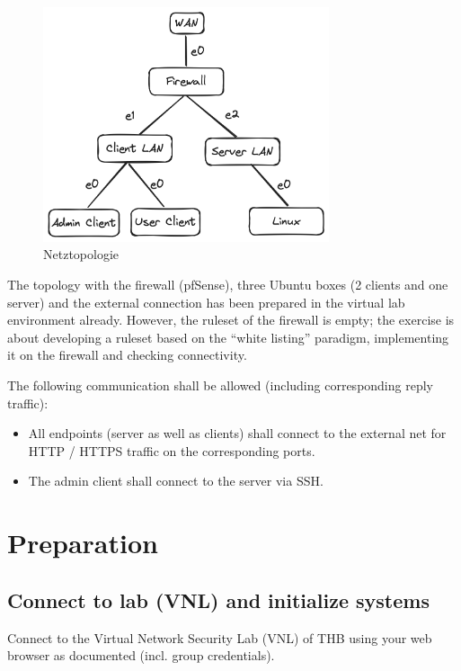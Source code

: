 \documentclass{article}
\begin{document}
\begin{figure}[H]
	\includegraphics[width=0.75\textwidth]{images/01}
	\centering
	\caption{Netztopologie}
\end{figure}

The topology with the firewall (pfSense), three Ubuntu boxes (2 clients and one 
server) and the external connection has been prepared in the virtual lab environment 
already. However, the ruleset of the firewall is empty; the exercise is about 
developing a ruleset based on the “white listing” paradigm, implementing it on the 
firewall and checking connectivity.

The following communication shall be allowed (including corresponding reply traffic):

\begin{itemize}
    \item All endpoints (server as well as clients) shall connect to the external net for HTTP / HTTPS traffic on the corresponding ports.
    \item The admin client shall connect to the server via SSH.
\end{itemize}

\section{Preparation}

\subsection{Connect to lab (VNL) and initialize systems}

Connect to the Virtual Network Security Lab (VNL) of THB using your web browser as 
documented (incl. group credentials). 
\end{document}
